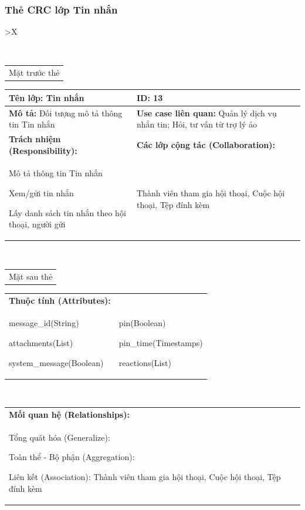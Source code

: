 \subsubsection{Thẻ CRC lớp Tin nhắn}
  \begin{xltabular}{\textwidth}{
    >{\centering\arraybackslash}X 
  }
  \caption{\bfseries \fontsize{12pt}{0pt}\selectfont Thẻ CRC lớp Tin nhắn}
  \\
  \begin{tabularx}{0.9\textwidth}{X}
    Mặt trước thẻ
  \end{tabularx}
  \begin{tabularx}{0.9\textwidth}{|X|X|}
    \hline
    \textbf{Tên lớp:} Tin nhắn & \textbf{ID:} 13 \\
    \hline
    \textbf{Mô tả:} Đối tượng mô tả thông tin Tin nhắn & \textbf{Use case liên quan:} Quản lý dịch vụ nhắn tin; Hỏi, tư vấn từ trợ lý ảo \\
    \hline
    \textbf{Trách nhiệm (Responsibility):} & \textbf{Các lớp cộng tác (Collaboration):} \\
    Mô tả thông tin Tin nhắn

    Xem/gửi tin nhắn

    Lấy danh sách tin nhắn theo hội thoại, người gửi
    & 
    Thành viên tham gia hội thoại, Cuộc hội thoại, Tệp đính kèm
    \\
    \hline
  \end{tabularx}
  \\ 
  \begin{tabularx}{0.9\textwidth}{X}
    Mặt sau thẻ
  \end{tabularx} 
  \begin{tabularx}{0.9\textwidth}{|X|X|}
    \hline
    \textbf{Thuộc tính (Attributes):} & \\
    message\_id(String) 

    attachments(List)
    
    system\_message(Boolean)
    &
    pin(Boolean)

    pin\_time(Timestamps)

    reactions(List)
    \\
    \hline
  \end{tabularx}
  \\     
  \begin{tabularx}{0.9\textwidth}{|X|}
    \textbf{Mối quan hệ (Relationships):} \\
    Tổng quát hóa (Generalize):  

    Toàn thể - Bộ phận (Aggregation): 
    
    Liên kết (Association): Thành viên tham gia hội thoại, Cuộc hội thoại, Tệp đính kèm 
    \\
    \hline
  \end{tabularx}
  \end{xltabular}

